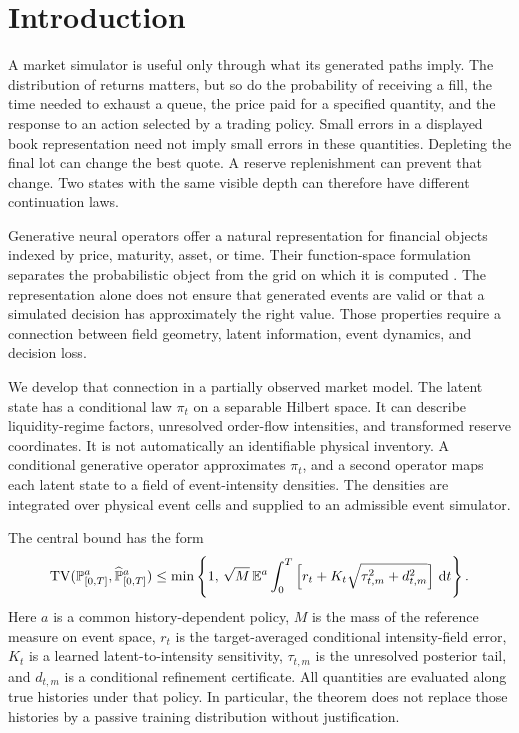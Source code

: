 \section{Introduction}\label{sec:intro}
A market simulator is useful only through what its generated paths imply. The distribution of returns matters, but so do the probability of receiving a fill, the time needed to exhaust a queue, the price paid for a specified quantity, and the response to an action selected by a trading policy. Small errors in a displayed book representation need not imply small errors in these quantities. Depleting the final lot can change the best quote. A reserve replenishment can prevent that change. Two states with the same visible depth can therefore have different continuation laws.

Generative neural operators offer a natural representation for financial objects indexed by price, maturity, asset, or time. Their function-space formulation separates the probabilistic object from the grid on which it is computed \citep{kovachki2023,rahman2022,kerrigan2024functional}. The representation alone does not ensure that generated events are valid or that a simulated decision has approximately the right value. Those properties require a connection between field geometry, latent information, event dynamics, and decision loss.

We develop that connection in a partially observed market model. The latent state has a conditional law $\pi_t$ on a separable Hilbert space. It can describe liquidity-regime factors, unresolved order-flow intensities, and transformed reserve coordinates. It is not automatically an identifiable physical inventory. A conditional generative operator approximates $\pi_t$, and a second operator maps each latent state to a field of event-intensity densities. The densities are integrated over physical event cells and supplied to an admissible event simulator.

The central bound has the form
\begin{equation}\label{eq:intro-bound}
 \operatorname{TV}(\mathbb P^a_{[0,T]},\widehat{\mathbb P}^a_{[0,T]})
 \le \min\left\{1,\,
 \sqrt M\,\mathbb E^a\int_0^T
 \left[r_t+K_t\sqrt{\tau_{t,m}^2+d_{t,m}^2}\right]\,\mathrm d t\right\}.
\end{equation}
Here $a$ is a common history-dependent policy, $M$ is the mass of the reference measure on event space, $r_t$ is the target-averaged conditional intensity-field error, $K_t$ is a learned latent-to-intensity sensitivity, $\tau_{t,m}$ is the unresolved posterior tail, and $d_{t,m}$ is a conditional refinement certificate. All quantities are evaluated along true histories under that policy. In particular, the theorem does not replace those histories by a passive training distribution without justification.

